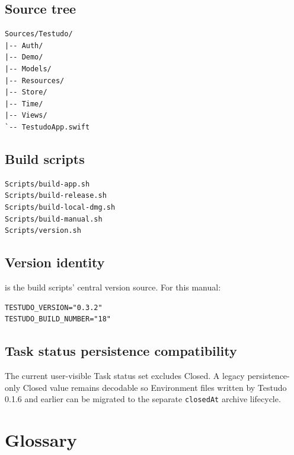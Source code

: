 \documentclass{testudomanual}
\begin{document}
\section{Source tree}

\begin{lstlisting}
Sources/Testudo/
|-- Auth/
|-- Demo/
|-- Models/
|-- Resources/
|-- Store/
|-- Time/
|-- Views/
`-- TestudoApp.swift
\end{lstlisting}

\section{Build scripts}

\begin{lstlisting}
Scripts/build-app.sh
Scripts/build-release.sh
Scripts/build-local-dmg.sh
Scripts/build-manual.sh
Scripts/version.sh
\end{lstlisting}

\section{Version identity}

 is the build scripts' central version source. For this manual:
\begin{lstlisting}
TESTUDO_VERSION="0.3.2"
TESTUDO_BUILD_NUMBER="18"
\end{lstlisting}

\section{Task status persistence compatibility}

The current user-visible Task status set excludes Closed. A legacy persistence-only Closed value remains decodable so Environment files written by Testudo 0.1.6 and earlier can be migrated to the separate \texttt{closedAt} archive lifecycle.

\chapter{Glossary}
\end{document}
